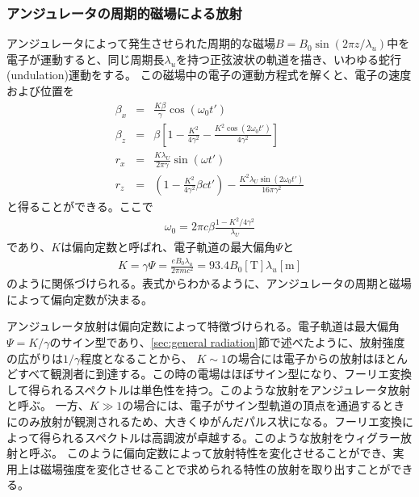 \documentclass[a4paper,11pt,uplatex]{jsbook}
\begin{document}
\subsubsection{アンジュレータの周期的磁場による放射}\label{sec:undulator radiation}
アンジュレータによって発生させられた周期的な磁場$B = B_0 \sin(2\pi z/\lambda_u)$中を電子が運動すると、同じ周期長$\lambda_u$を持つ正弦波状の軌道を描き、いわゆる蛇行(undulation)運動をする。
この磁場中の電子の運動方程式を解くと、電子の速度および位置を
\begin{eqnarray}\label{eq:undulator motion}
  \beta_x &=& \frac{K\beta}{\gamma}\cos(\omega_0 t')\\
  \beta_z &=& \beta\left[1 - \frac{K^2}{4\gamma^2} -\frac{K^2\cos (2\omega_0 t')}{4\gamma^2} \right]\\
  r_x &=& \frac{K\lambda_U}{2\pi \gamma}\sin(\omega t')\\
  r_z &=& \left(1-\frac{K^2}{4\gamma^2}\beta c t'\right) - \frac{K^2\lambda_U \sin(2\omega_0 t')}{16\pi \gamma^2}
\end{eqnarray}
と得ることができる。ここで
\begin{eqnarray}
  \omega_0 = 2\pi c\beta \frac{1-K^2/4\gamma^2}{\lambda_U}
\end{eqnarray}
であり、$K$は偏向定数と呼ばれ、電子軌道の最大偏角$\Psi$と
\begin{eqnarray}
  K = \gamma \Psi = \frac{eB_0\lambda_u}{2\pi m c^2} = 93.4 B_0[\text{T}]\lambda_u[\text{m}]
\end{eqnarray}
のように関係づけられる。表式からわかるように、アンジュレータの周期と磁場によって偏向定数が決まる。

アンジュレータ放射は偏向定数によって特徴づけられる。電子軌道は最大偏角$\Psi = K/\gamma$のサイン型であり、\ref{sec:general radiation}節で述べたように、放射強度の広がりは$1/\gamma$程度となることから、
$K \sim 1$の場合には電子からの放射はほとんどすべて観測者に到達する。この時の電場はほぼサイン型になり、フーリエ変換して得られるスペクトルは単色性を持つ。このような放射をアンジュレータ放射と呼ぶ。
一方、$K \gg 1$の場合には、電子がサイン型軌道の頂点を通過するときにのみ放射が観測されるため、大きくゆがんだパルス状になる。フーリエ変換によって得られるスペクトルは高調波が卓越する。このような放射をウィグラー放射と呼ぶ。
このように偏向定数によって放射特性を変化させることができ、実用上は磁場強度を変化させることで求められる特性の放射を取り出すことができる。
\end{document}
